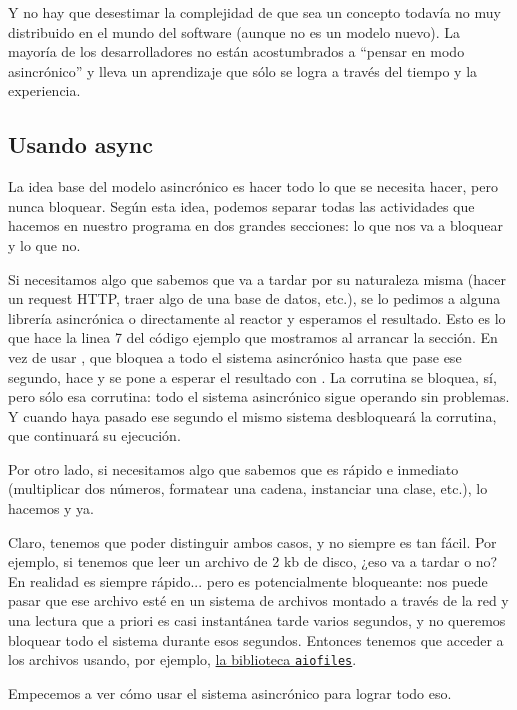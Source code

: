 Y no hay que desestimar la complejidad de que sea un concepto todavía no muy distribuido en el mundo del software (aunque no es un modelo nuevo). La mayoría de los desarrolladores no están acostumbrados a ``pensar en modo asincrónico'' y lleva un aprendizaje que sólo se logra a través del tiempo y la experiencia.

\subsection{Usando async}\label{sub:usando-async}

La idea base del modelo asincrónico es hacer todo lo que se necesita hacer, pero nunca bloquear. Según esta idea, podemos separar todas las actividades que hacemos en nuestro programa en dos grandes secciones: lo que nos va a bloquear y lo que no.

Si necesitamos algo que sabemos que va a tardar por su naturaleza misma (hacer un request HTTP, traer algo de una base de datos, etc.), se lo pedimos a alguna librería asincrónica o directamente al reactor y esperamos el resultado. Esto es lo que hace la linea 7 del código ejemplo que mostramos al arrancar la sección. En vez de usar , que bloquea a todo el sistema asincrónico hasta que pase ese segundo, hace  y se pone a esperar el resultado con . La corrutina se bloquea, sí, pero sólo esa corrutina: todo el sistema asincrónico sigue operando sin problemas. Y cuando haya pasado ese segundo el mismo sistema desbloqueará la corrutina, que continuará su ejecución.

Por otro lado, si necesitamos algo que sabemos que es rápido e inmediato (multiplicar dos números, formatear una cadena, instanciar una clase, etc.), lo hacemos y ya.

Claro, tenemos que poder distinguir ambos casos, y no siempre es tan fácil. Por ejemplo, si tenemos que leer un archivo de 2 kb de disco, ¿eso va a tardar o no? En realidad es siempre rápido... pero es potencialmente bloqueante: nos puede pasar que ese archivo esté en un sistema de archivos montado a través de la red y una lectura que a priori es casi instantánea tarde varios segundos, y no queremos bloquear todo el sistema durante esos segundos. Entonces tenemos que acceder a los archivos usando, por ejemplo, \href{https://pypi.org/project/aiofiles/}{la biblioteca \texttt{aiofiles}}.

Empecemos a ver cómo usar el sistema asincrónico para lograr todo eso.

